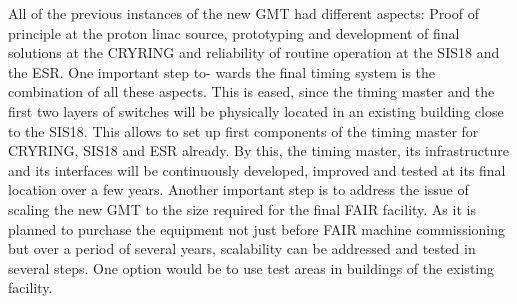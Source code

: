 All of the previous instances of
the new GMT had different aspects: Proof of principle at
the proton linac source, prototyping and development of
final solutions at the CRYRING and reliability of routine
operation at the SIS18 and the ESR. One important step to-
wards the final timing system is the combination of all these
aspects. This is eased, since the timing master and the first
two layers of switches will be physically located in an existing 
building close to the SIS18. This allows to set up first
components of the timing master for CRYRING, SIS18 and
ESR already. By this, the timing master, its infrastructure
and its interfaces will be continuously developed, improved
and tested at its final location over a few years.
Another important step is to address the issue of scaling
the new GMT to the size required for the final FAIR facility. 
As it is planned to purchase the equipment not just
before FAIR machine commissioning but over a period of
several years, scalability can be addressed and tested in several steps. 
One option would be to use test areas in buildings of the existing facility.

